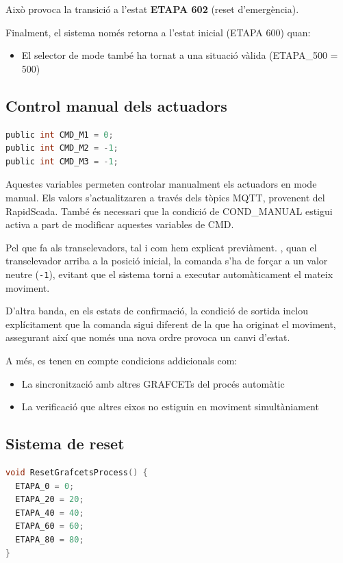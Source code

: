\documentclass[12pt,a4paper]{report}
\begin{document}
Això provoca la transició a l'estat \textbf{ETAPA 602} (reset d'emergència).

Finalment, el sistema només retorna a l'estat inicial (ETAPA 600) quan:
\begin{itemize}
\item El selector de mode també ha tornat a una situació vàlida (ETAPA\_500 = 500)
\end{itemize}

\subsection{Control manual dels actuadors}

\begin{lstlisting}[language=C]
public int CMD_M1 = 0;
public int CMD_M2 = -1;
public int CMD_M3 = -1;
\end{lstlisting}

Aquestes variables permeten controlar manualment els actuadors en mode manual. Els valors s'actualitzaren a través dels tòpics MQTT, provenent del RapidScada. També és necessari que la condició de COND\_MANUAL estigui activa a part de modificar aquestes variables de CMD. 

Pel que fa als transelevadors, tal i com hem explicat previàment. , quan el transelevador arriba a la posició inicial, la comanda s'ha de forçar a un valor neutre (\texttt{-1}), evitant que el sistema torni a executar automàticament el mateix moviment.

D'altra banda, en els estats de confirmació, la condició de sortida inclou explícitament que la comanda sigui diferent de la que ha originat el moviment, assegurant així que només una nova ordre provoca un canvi d'estat.

A més, es tenen en compte condicions addicionals com:
\begin{itemize}
\item La sincronització amb altres GRAFCETs del procés automàtic
\item La verificació que altres eixos no estiguin en moviment simultàniament
\end{itemize}

\subsection{Sistema de reset}

\begin{lstlisting}[language=C]
void ResetGrafcetsProcess() {
  ETAPA_0 = 0;
  ETAPA_20 = 20;
  ETAPA_40 = 40;
  ETAPA_60 = 60;
  ETAPA_80 = 80;
}
\end{lstlisting}
\end{document}
